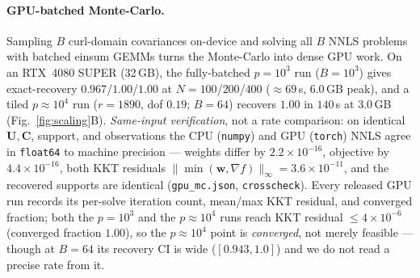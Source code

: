 \documentclass[11pt]{article}
\begin{document}
\paragraph{GPU-batched Monte-Carlo.} Sampling $B$ curl-domain covariances
on-device and solving all $B$ NNLS problems with batched einsum GEMMs turns the
Monte-Carlo into dense GPU work. On an RTX~4080 SUPER (32\,GB), the fully-batched
$p{=}10^3$ run ($B{=}10^3$) gives exact-recovery $0.967$/$1.00$/$1.00$ at
$N{=}100$/$200$/$400$ ($\approx69$\,s, $6.0$\,GB peak), and a tiled
$p{\approx}10^4$ run ($r{=}1890$, dof $0.19$; $B{=}64$) recovers $1.00$ in
$140$\,s at $3.0$\,GB (Fig.~\ref{fig:scaling}B). \emph{Same-input verification},
not a rate comparison: on identical $\bm U,\bm C$, support, and observations the
CPU (\texttt{numpy}) and GPU (\texttt{torch}) NNLS agree in \texttt{float64} to
machine precision --- weights differ by $2.2\times10^{-16}$, objective by
$4.4\times10^{-16}$, both KKT residuals $\|\min(\bm w,\nabla f)\|_\infty
{=}3.6\times10^{-11}$, and the recovered supports are identical
(\texttt{gpu\_mc.json}, \texttt{crosscheck}). Every released GPU run records its
per-solve iteration count, mean/max KKT residual, and converged fraction; both
the $p{=}10^3$ and the $p{\approx}10^4$ runs reach KKT residual $\le4{\times}10^{-6}$
(converged fraction $1.00$), so the $p{\approx}10^4$ point is \emph{converged},
not merely feasible --- though at $B{=}64$ its recovery CI is wide
($[0.943,1.0]$) and we do not read a precise rate from it.
\end{document}

